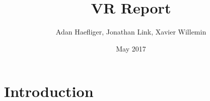 \documentclass{article}
\title{VR Report}
\author{Adan Haefliger, Jonathan Link, Xavier Willemin}
\date{May 2017}
\begin{document}
\maketitle

\section{Introduction}
\end{document}
